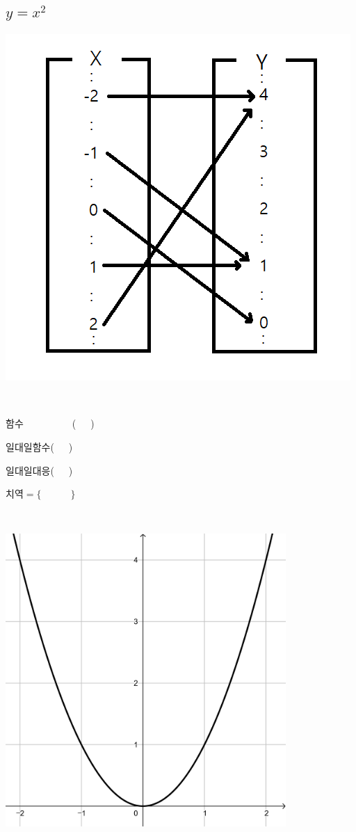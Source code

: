 \documentclass[a4paper]{oblivoir}
\begin{document}
\subsection{\(y=x^2\)}
%
\begin{minipage}{0.4\textwidth}
\includegraphics[width=\textwidth]{y=x^2}
\end{minipage}
~
\begin{minipage}{0.20\textwidth}
함수~~~~~~~~~~(~~~)\par\bigskip
일대일함수(~~~)\par\bigskip
일대일대응(~~~)\par\bigskip
치역\(=\{\qquad\quad\}\)
\end{minipage}
~
\begin{minipage}{0.35\textwidth}
\includegraphics[width=0.8\textwidth]{y=x^2-}
\end{minipage}
\end{document}

